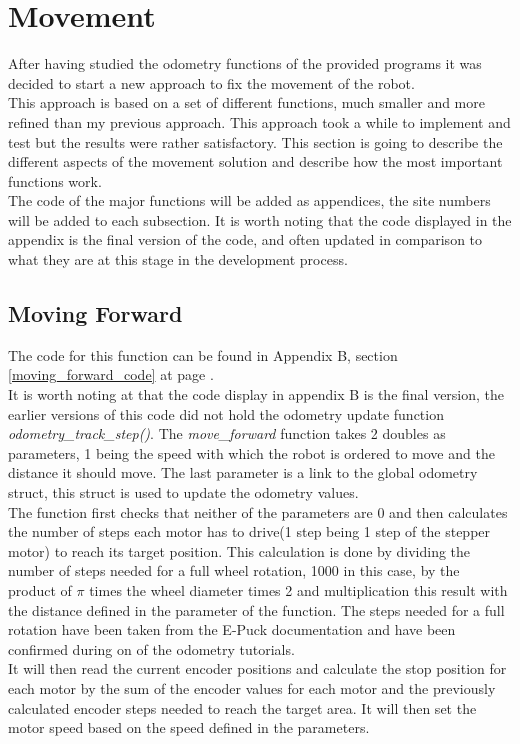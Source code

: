 \section{Movement}
After having studied the odometry functions of the provided programs it was decided to start a new approach to fix the movement of the robot.\\
This approach is based on a set of different functions, much smaller and more refined than my previous approach. This approach took a while to implement and test but the results were rather satisfactory. This section is going to describe the different aspects of the movement solution and describe how the most important functions work.\\
The code of the major functions will be added as appendices, the site numbers will be added to each subsection. It is worth noting that the code displayed in the appendix is the final version of the code, and often updated in comparison to what they are at this stage in the development process.

\subsection{Moving Forward}
\label{moving_forward_description}
The code for this function can be found in Appendix B, section \ref{moving_forward_code} at page \pageref{moving_forward_code}.\\
It is worth noting at that the code display in appendix B is the final version, the earlier versions of this code did not hold the odometry update function \textit{odometry\_track\_step()}.
The \textit{move\_forward }function takes 2 doubles as parameters, 1 being the speed with which the robot is ordered to move and the distance it should move. The last parameter is a link to the global odometry struct, this struct is used to update the odometry values.\\
The function first checks that neither of the parameters are 0 and then calculates the number of steps each motor has to drive(1 step being 1 step of the stepper motor) to reach its target position.
This calculation is done by dividing the number of steps needed for a full wheel rotation, 1000 in this case, by the product of $\pi$ times the wheel diameter times 2 and multiplication this result with the distance defined in the parameter of the function. The steps needed for a full rotation have been taken from the E-Puck documentation and have been confirmed during on of the odometry tutorials. \\
It will then read the current encoder positions and calculate the stop position for each motor by the sum of the encoder values for each motor and the previously calculated encoder steps needed to reach the target area.
It will then set the motor speed based on the speed defined in the parameters.\\[3ex]

